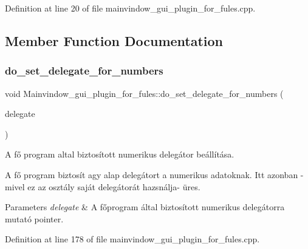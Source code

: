 Definition at line 20 of file mainvindow\+\_\+gui\+\_\+plugin\+\_\+for\+\_\+fules.\+cpp.



\subsection{Member Function Documentation}
\mbox{\label{classMainvindow__gui__plugin__for__fules_a7a76e31c7008ec8a41db6dc0ebbe20ee}} 
\subsubsection{\texorpdfstring{do\+\_\+set\+\_\+delegate\+\_\+for\+\_\+numbers}{do\_set\_delegate\_for\_numbers}}
{\footnotesize\ttfamily void Mainvindow\+\_\+gui\+\_\+plugin\+\_\+for\+\_\+fules\+::do\+\_\+set\+\_\+delegate\+\_\+for\+\_\+numbers (\begin{DoxyParamCaption}\item[{Q\+Styled\+Item\+Delegate $\ast$}]{delegate }\end{DoxyParamCaption})\hspace{0.3cm}{\ttfamily [slot]}}



A fő program altal biztosított numerikus delegátor beállítása. 

A fő program biztosít agy alap delegátort a numerikus adatoknak. Itt azonban -\/mivel ez az osztály saját delegátorát hazsnálja-\/ üres.


\begin{DoxyParams}{Parameters}
{\em delegate} & A főprogram által biztosított numerikus delegátorra mutató pointer. \\
\hline
\end{DoxyParams}


Definition at line 178 of file mainvindow\+\_\+gui\+\_\+plugin\+\_\+for\+\_\+fules.\+cpp.

\mbox{\label{classMainvindow__gui__plugin__for__fules_a92ccf25dd20d9cd95bac846cee83b7f8}} 
